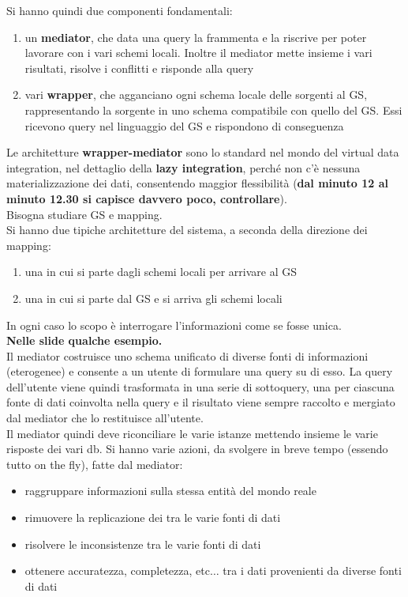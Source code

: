 \documentclass[a4paper,12pt, oneside]{book}
\begin{document}
Si hanno quindi due componenti fondamentali:
\begin{enumerate}
  \item un \textbf{mediator}, che data una query la frammenta e la riscrive per
  poter lavorare con i vari schemi locali. Inoltre il mediator mette insieme i
  vari risultati, risolve i conflitti e risponde alla query
  \item vari \textbf{wrapper}, che agganciano ogni schema locale delle sorgenti
  al GS, rappresentando la sorgente in uno schema compatibile con quello del
  GS. Essi ricevono query nel linguaggio del GS e rispondono di conseguenza
\end{enumerate}
Le architetture \textbf{wrapper-mediator} sono lo standard nel mondo del virtual
data integration, nel dettaglio della \textbf{lazy integration}, perché non c'è 
nessuna materializzazione dei dati,
consentendo maggior flessibilità (\textbf{dal minuto 12
  al minuto 12.30 si capisce davvero poco, controllare}).\\
Bisogna studiare GS e mapping.\\
Si hanno due tipiche architetture del sistema, a seconda della direzione dei
mapping: 
\begin{enumerate}
  \item una in cui si parte dagli schemi locali per arrivare al GS
  \item una in cui si parte dal GS e si arriva gli schemi locali
\end{enumerate}
In ogni caso lo scopo è interrogare l'informazioni come se fosse unica.\\
\textbf{Nelle slide qualche esempio.}\\
Il mediator costruisce uno schema unificato di diverse fonti di informazioni
(eterogenee) e consente a un utente di formulare una query su di esso. La query
dell'utente viene quindi trasformata in una serie di sottoquery, una per
ciascuna fonte di dati coinvolta nella query e il risultato viene sempre
raccolto e mergiato dal mediator che lo restituisce all'utente.\\
Il mediator quindi deve riconciliare le varie istanze mettendo insieme le varie
risposte dei vari db. Si hanno varie azioni, da svolgere in breve tempo (essendo
tutto on the fly), fatte dal mediator:
\begin{itemize}
  \item raggruppare informazioni sulla stessa entità del mondo reale 
  \item rimuovere la replicazione dei tra le varie fonti di dati 
  \item risolvere le inconsistenze tra le varie fonti di dati 
  \item ottenere accuratezza, completezza, etc$\ldots$ tra i dati provenienti da
  diverse fonti di dati   
\end{itemize}
\end{document}

